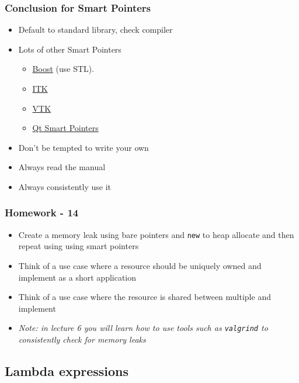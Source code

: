 \subsubsection{Conclusion for Smart
Pointers}\label{conclusion-for-smart-pointers}

\begin{itemize}
\itemsep1pt\parskip0pt
\item
  Default to standard library, check compiler
\item
  Lots of other Smart Pointers

  \begin{itemize}
  \itemsep1pt\parskip0pt
  \item
    \href{http://www.boost.org}{Boost} (use STL).
  \item
    \href{http://www.itk.org}{ITK}
  \item
    \href{http://www.vtk.org/Wiki/VTK/Tutorials/SmartPointers}{VTK}
  \item
    \href{https://wiki.qt.io/Smart_Pointers}{Qt Smart Pointers}
  \end{itemize}
\item
  Don't be tempted to write your own
\item
  Always read the manual
\item
  Always consistently use it
\end{itemize}

\subsubsection{Homework - 14}\label{homework---14}

\begin{itemize}
\itemsep1pt\parskip0pt
\item
  Create a memory leak using bare pointers and \texttt{new} to heap
  allocate and then repeat using using smart pointers
\item
  Think of a use case where a resource should be uniquely owned and
  implement as a short application
\item
  Think of a use case where the resource is shared between multiple and
  implement
\item
  \emph{Note: in lecture 6 you will learn how to use tools such as
  \texttt{valgrind} to consistently check for memory leaks}
\end{itemize}

\subsection{Lambda expressions}\label{lambda-expressions}

